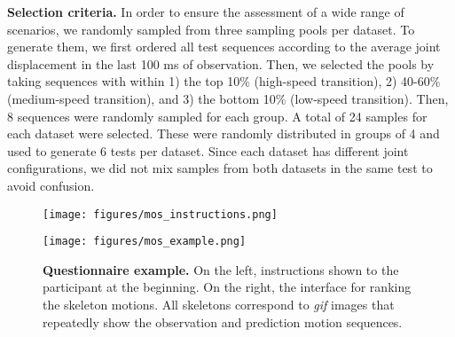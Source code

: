 \documentclass[10pt,twocolumn,letterpaper]{article}
\begin{document}
\textbf{Selection criteria. } In order to ensure the assessment of a wide range of scenarios, we randomly sampled from three sampling pools per dataset. To generate them, we first ordered all test sequences according to the average joint displacement  in the last 100 ms of observation. Then, we selected the pools by taking sequences with  within 1) the top 10\% (high-speed transition), 2) 40-60\% (medium-speed transition), and 3) the bottom 10\% (low-speed transition). Then, 8 sequences were randomly sampled for each group. A total of 24 samples for each dataset were selected. These were randomly distributed in groups of 4 and used to generate 6 tests per dataset. Since each dataset has different joint configurations, we did not mix samples from both datasets in the same test to avoid confusion.


\begin{figure*}
    \centering
    \begin{minipage}{.48\textwidth}
        \centering
        \texttt{[image: figures/mos\_instructions.png]}
        \label{fig:supp_mos_example}
    \end{minipage}\hfill
    \begin{minipage}{0.48\textwidth}
        \centering
        \texttt{[image: figures/mos\_example.png]}
        \label{fig:supp_mos_instructions}
    \end{minipage}
    \caption{\textbf{Questionnaire example. }On the left, instructions shown to the participant at the beginning. On the right, the interface for ranking the skeleton motions. All skeletons correspond to \textit{gif} images that repeatedly show the observation and prediction motion sequences. }
    \label{fig:supp_mos}
\end{figure*}
\end{document}
